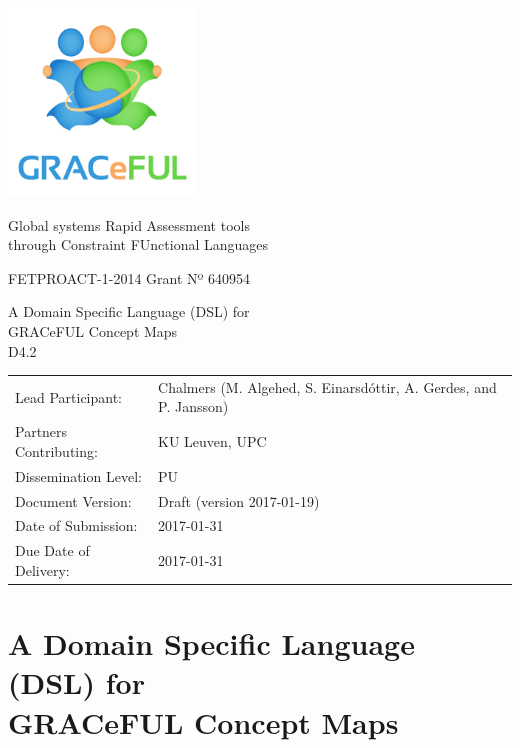 \documentclass[]{article}
\author{}
\date{}
\begin{document}
\begin{center}
\includegraphics[width=5cm]{../coverpage/GRACeFULlogo.png}

\textcolor{GRACeFULblue}{Global systems Rapid Assessment tools\\
through Constraint FUnctional Languages}

\vspace{1cm}

FETPROACT-1-2014 Grant Nº 640954

\end{center}

\begin{framed}
\begin{center}
\Large
A Domain Specific Language (DSL) for \\
GRACeFUL Concept Maps\\[1ex]

D4.2\\[1ex]

\end{center}
\end{framed}

\vspace{1cm}

\noindent
\begin{tabular}{@{}ll@{}}
  Lead Participant:       & Chalmers (M. Algehed, S. Einarsdóttir, A. Gerdes, and P. Jansson)
\\Partners Contributing:  & KU Leuven, UPC
\\Dissemination Level:    & PU
\\Document Version:       & Draft (version 2017-01-19)
\\Date of Submission:     & 2017-01-31
\\Due Date of Delivery:   & 2017-01-31
\end{tabular}

\newpage

\section*{A Domain Specific Language (DSL) for\\GRACeFUL Concept Maps}\label{DSL4GRACeFUL}
\end{document}

